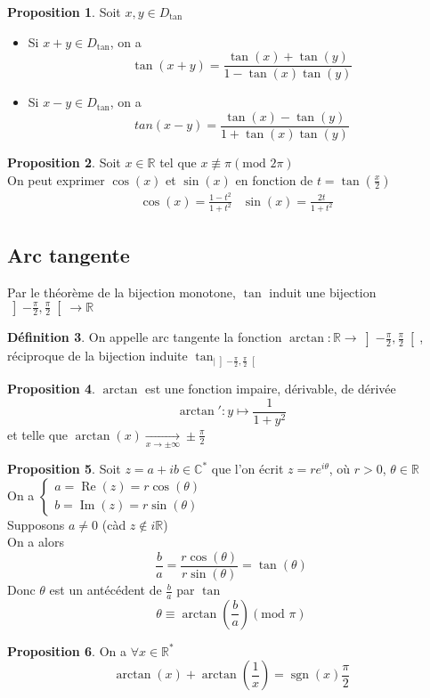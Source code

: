 \documentclass[10pt,a4paper]{article}
\theoremstyle{definition}
\newtheorem{proposition}{Proposition}[section]
\newtheorem{definition}[proposition]{Définition}
\DeclareMathOperator{\re}{Re}
\DeclareMathOperator{\im}{Im}
\DeclareMathOperator{\sgn}{sgn}
\begin{document}
\pagebreak

\begin{proposition}
Soit $x, y \in D_\text{tan}$
\begin{itemize}
\item Si $x + y \in D_\text{tan}$, on a
\[\tan(x + y) = \frac{\tan(x) + \tan(y)}{1 - \tan(x) \tan(y)}\]
\item Si $x - y \in D_\text{tan}$, on a
\[tan(x - y) = \frac{\tan(x) - \tan(y)}{1 + \tan(x) \tan(y)}\]
\end{itemize}
\end{proposition}
\begin{proposition}
Soit $x \in \mathbb{R}$ tel que $x \not\equiv \pi (\text{mod } 2\pi)$ \\
On peut exprimer $\cos(x)$ et $\sin(x)$ en fonction de $t = \tan(\frac{x}{2})$
\begin{align*}
&\cos(x) = \frac{1 - t^2}{1 + t^2} &\sin(x) = \frac{2t}{1 + t^2}
\end{align*}
\end{proposition}

\subsection{Arc tangente}
Par le théorème de la bijection monotone, $\tan$ induit une bijection $\left] -\frac{\pi}{2}, \frac{\pi}{2} \right[ \to \mathbb{R}$
\begin{definition}
On appelle arc tangente la fonction $\arctan: \mathbb{R} \to \left] -\frac{\pi}{2}, \frac{\pi}{2} \right[$, \\
réciproque de la bijection induite $\tan_{|\left] - \frac{\pi}{2}, \frac{\pi}{2} \right[}$
\end{definition}
\begin{proposition}
$\arctan$ est une fonction impaire, dérivable, de dérivée
\[\arctan': y \mapsto \frac{1}{1 + y^2}\]
et telle que $\arctan(x) \xrightarrow[x \to \pm\infty]{} \pm \frac{\pi}{2}$
\end{proposition}
\begin{proposition}
Soit $z = a + ib \in \mathbb{C}^*$ que l'on écrit $z = re^{i \theta}$, où $r > 0$, $\theta \in \mathbb{R}$ \\
On a $\begin{cases}
a = \re(z) = r \cos(\theta) \\
b = \im(z) = r \sin(\theta)
\end{cases}$ \\
Supposons $a \neq 0$ (càd $z \not\in i \mathbb{R}$) \\
On a alors
\[\frac{b}{a} = \frac{r \cos(\theta)}{r \sin(\theta)} = \tan(\theta)\]
Donc $\theta$ est un antécédent de $\frac{b}{a}$ par $\tan$
\[\theta \equiv \arctan \left(\frac{b}{a}\right) (\text{mod } \pi)\]
\end{proposition}
\begin{proposition}
On a $\forall x \in \mathbb{R}^*$
\[\arctan(x) + \arctan \left( \frac{1}{x} \right) = \sgn(x) \frac{\pi}{2} \]
\end{proposition}
\end{document}
